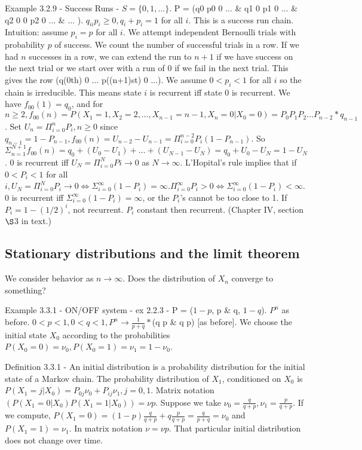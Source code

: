 \documentclass{article}
\begin{document}
Example 3.2.9 - Success Runs - $S = \{0, 1, \dots \}$. P = (q0 p0 0 ... \& q1 0 p1 0 ... \& q2 0 0 p2 0 ... \& ... ). $q_{ii} p_i \ge 0, q_i + p_i = 1$ for all $i$. This is a success run chain. Intuition: assume $p_i = p$ for all $i$. We attempt independent Bernoulli trials with probability $p$ of success. We count the number of successful trials in a row. If we had $n$ successes in a row, we can extend the run to $n + 1$ if we have success on the next trial or we start over with a run of 0 if we fail in the next trial. This gives the row (q(0th) 0 ... p((n+1)st) 0 ...). We assume $0 < p_i < 1$ for all $i$ so the chain is irreducible. This means state $i$ is recurrent iff state 0 is recurrent. We have $f_{00}(1) = q_0$, and for $n \ge 2, f_{00}(n) = P(X_1=1, X_2=2, \dots, X_{n-1}=n-1, X_n=0|X_0=0) = P_0 P_1 P_2 \dots P_{n-2} * q_{n-1}$. Set $U_n = \Pi_{i=0}^n P_i, n \ge 0$ since $q_{n-1} = 1 - P_{n-1}, f_{00}(n) = U_{n-2} - U_{n-1} = \Pi_{i=0}^{n-2} P_i(1 - P_{n-1})$. So $\Sigma_{n=1}^{N+1} f_{00}(n) = q_0 + (U_0 - U_1) + \dots + (U_{N-1} - U_N) = q_0 + U_0 - U_N = 1 - U_N$. 0 is recurrent iff $U_N = \Pi_{i=0}^N Pi \rightarrow 0$ as $N \rightarrow \infty$. L'Hopital's rule implies that if $0 < P_i < 1$ for all $i, U_N = \Pi_{i=0}^N P_i \rightarrow 0 \iff \Sigma_{i=0}^\infty (1-P_i) = \infty. \Pi_{i=0}^\infty P_i > 0 \iff \Sigma_{i=0}^\infty (1-P_i) < \infty$. 0 is recurrent iff $\Sigma_{i=0}^\infty (1-P_i) = \infty$, or the $P_i$'s cannot be too close to 1. If $P_i = 1 - (1/2)^i$, not recurrent. $P_i$ constant then recurrent. (Chapter IV, section $\S$3 in text.)

\subsection{Stationary distributions and the limit theorem}

We consider behavior as $n \rightarrow \infty$. Does the distribution of $X_n$ converge to something?

Example 3.3.1 - ON/OFF system - ex 2.2.3 - P = ($1-p$, p \& q, $1-q$). $P^n$ as before. $0 < p < 1, 0 < q < 1, P^n \rightarrow \frac{1}{p + q} * $(q p \& q p) [as before]. We choose the initial state $X_0$ according to the probabilities $P(X_0 = 0) = \nu_0, P(X_0=1) = \nu_1 = 1 - \nu_0$.

Definition 3.3.1 - An initial distribution is a probability distribution for the initial state of a Markov chain. The probability distribution of $X_1$, conditioned on $X_0$ is $P(X_1=j|X_0) = P_{0j} \nu_0 + P_{ij} \nu_1, j = 0, 1$. Matrix notation $(P(X_1=0|X_0) P(X_1=1|X_0)) = \nu p$. Suppose we take $\nu_0 = \frac{q}{q + p}, \nu_1 = \frac{p}{q+p}$. If we compute, $P(X_1=0) = (1-p) \frac{q}{q+p} + q \frac{p}{q+p} = \frac{q}{p+q} = \nu_0$ and $P(X_1=1) = \nu_1$. In matrix notation $\nu = \nu p$. That particular initial distribution does not change over time.
\end{document}
